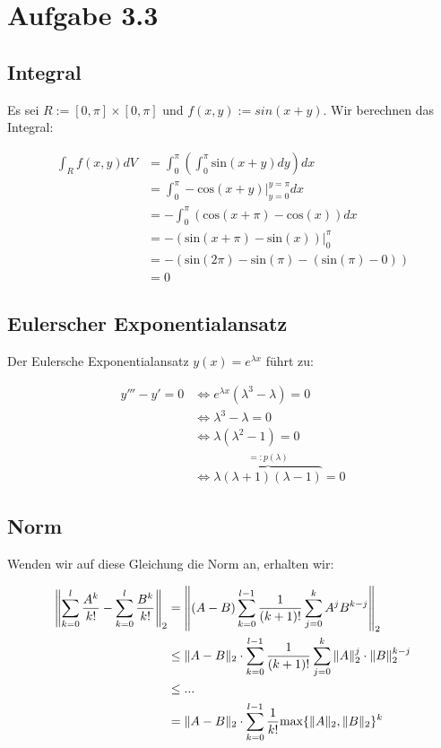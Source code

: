 \documentclass{article}
\begin{document}
\section{Aufgabe 3.3}

\subsection{Integral}

Es sei $R := [0,\pi] \times [0,\pi]$ und $f(x,y) := sin(x + y)$. Wir berechnen das Integral:

\begin{align*}
    \int_R f(x,y)dV & = \int_{0}^{\pi} \left( \int_{0}^{\pi} \textrm{sin}(x + y)dy \right) dx \\
    & = \int_{0}^{\pi} -\textrm{cos}(x + y) \Biggr|_{y=0}^{y=\pi} dx \\
    & = - \int_{0}^{\pi} (\textrm{cos}(x + \pi) - \textrm{cos}(x)) dx \\
    & = -(\textrm{sin}(x+\pi) - \textrm{sin}(x)) \Biggr|_{0}^{\pi} \\
    & = -(\textrm{sin}(2\pi) - \textrm{sin}(\pi) - (\textrm{sin}(\pi)-0)) \\
    & = 0
\end{align*}

\subsection{Eulerscher Exponentialansatz}

Der Eulersche Exponentialansatz $y(x) = e^{\lambda x}$ führt zu:

\begin{align*}
    y''' - y' = 0 & \Leftrightarrow e^{\lambda x}(\lambda^3 - \lambda) = 0 \\
    & \Leftrightarrow \lambda^3 - \lambda = 0 \\
    & \Leftrightarrow \lambda(\lambda^2 - 1) = 0 \\
    & \Leftrightarrow \overbrace{\lambda(\lambda + 1)(\lambda - 1)}^{=:p(\lambda)} = 0
\end{align*}

\subsection{Norm}

Wenden wir auf diese Gleichung die Norm an, erhalten wir:

\begin{align*}
    \left\| \sum_{k=0}^{l} {A^k \over k! } - \sum_{k=0}^{l} {B^k \over k!} \right\|_2 & = \left\| (A - B) \sum_{k=0}^{l-1} {1 \over (k + 1)! } \sum_{j=0}^{k} {A^j B^{k-j}} \right\|_2 \\
    & \leq \|A-B\|_2 \cdot \sum_{k=0}^{l-1} {1 \over (k + 1)! } \sum_{j=0}^{k} \|A\|_{2}^{j} \cdot \|B\|_{2}^{k-j} \\
    & \leq ... \\
    & = \|A-B\|_2 \cdot \sum_{k=0}^{l-1} {1 \over k!} \textrm{max}\{\|A\|_{2}, \|B\|_{2} \}^k
\end{align*}
\end{document}
